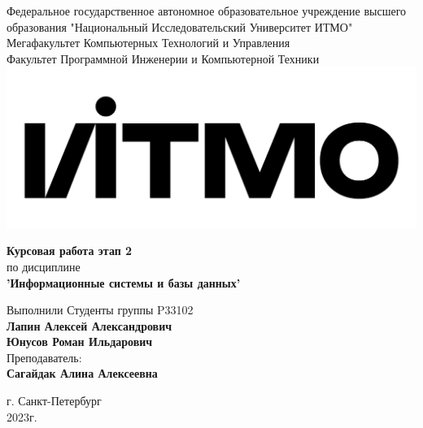 \documentclass[12pt,onecolumn]{article}
\begin{document}
\setcounter{tocdepth}{4}
\begin{center}
    Федеральное государственное автономное образовательное учреждение высшего образования "Национальный Исследовательский Университет ИТМО"\\ 
    Мегафакультет Компьютерных Технологий и Управления\\
    Факультет Программной Инженерии и Компьютерной Техники \\
    \includegraphics[scale=0.3]{image/itmo.jpg} %
\end{center}
\vspace{1cm}


\begin{center}
    \textbf{Курсовая работа этап 2}\\
    по дисциплине\\
    \textbf{'Информационные системы и базы данных'}\\
\end{center}

\vspace{2cm}

\begin{flushright}
  Выполнили Студенты  группы P33102\\
  \textbf{Лапин Алексей Александрович}\\
  \textbf{Юнусов Роман Ильдарович}\\
  Преподаватель: \\
  \textbf{Сагайдак Алина Алексеевна}\\
\end{flushright}

\vspace{6cm}
\begin{center}
    г. Санкт-Петербург\\
    2023г.
\end{center}

\newpage
\tableofcontents
\newpage
\end{document}

